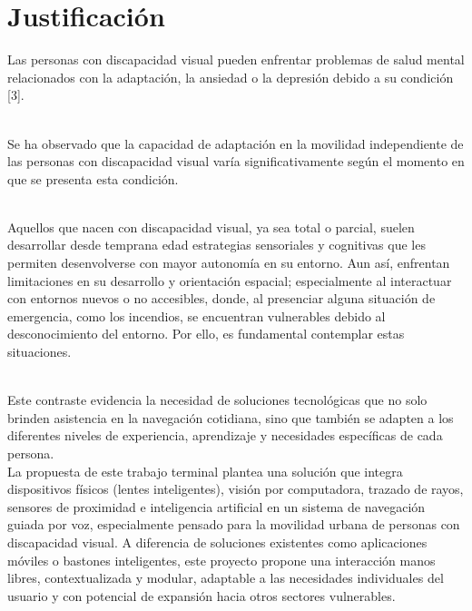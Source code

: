 \section{Justificación}







Las personas con discapacidad visual pueden enfrentar problemas de salud mental relacionados con la adaptación, la ansiedad o la depresión debido a su condición [3].  

\\

Se ha observado que la capacidad de adaptación en la movilidad independiente de las personas con discapacidad visual varía significativamente según el momento en que se presenta esta condición. 

\\

Aquellos que nacen con discapacidad visual, ya sea total o parcial, suelen desarrollar desde temprana edad estrategias sensoriales y cognitivas que les permiten desenvolverse con mayor autonomía en su entorno. Aun así, enfrentan limitaciones en su desarrollo y orientación espacial; especialmente al interactuar con entornos nuevos o no 
accesibles, donde, al presenciar alguna situación de emergencia, como los incendios, se encuentran vulnerables debido al desconocimiento del entorno. Por ello, es fundamental contemplar estas situaciones. 

\\

Este contraste evidencia la necesidad de soluciones tecnológicas que no solo brinden asistencia en la navegación cotidiana, sino que también se adapten a los diferentes niveles de experiencia, aprendizaje y  necesidades específicas de cada persona. \\

La propuesta de este trabajo terminal plantea una solución que integra dispositivos físicos (lentes inteligentes), visión por computadora, trazado de rayos, sensores de proximidad e inteligencia artificial en un sistema de navegación guiada por voz, especialmente pensado para la movilidad urbana de personas con discapacidad visual. A diferencia de soluciones existentes como aplicaciones móviles o bastones inteligentes, este proyecto propone una interacción manos libres, contextualizada y modular, adaptable a las necesidades individuales del usuario y con potencial de expansión hacia otros sectores vulnerables.

